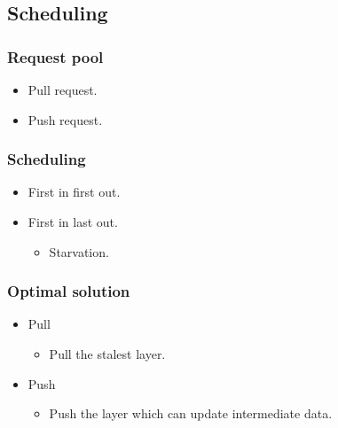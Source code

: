 \subsection{Scheduling}
\begin{frame}
	\frametitle{Request pool}
	\begin{itemize}
		\item Pull request. 
		\item Push request. 
	\end{itemize}
\end{frame}
\begin{frame}
	\frametitle{Scheduling}
	\begin{itemize}
		\item First in first out.
		\item First in last out.
			\begin{itemize}
				\item Starvation.
			\end{itemize}
	\end{itemize}
\end{frame}
\begin{frame}
	\frametitle{Optimal solution}
	\begin{itemize}
		\item Pull
		\begin{itemize}
			\item Pull the stalest layer. 
		\end{itemize}
		\item Push
		\begin{itemize}
			\item Push the layer which can update intermediate data. 
		\end{itemize}
	\end{itemize}
\end{frame}
